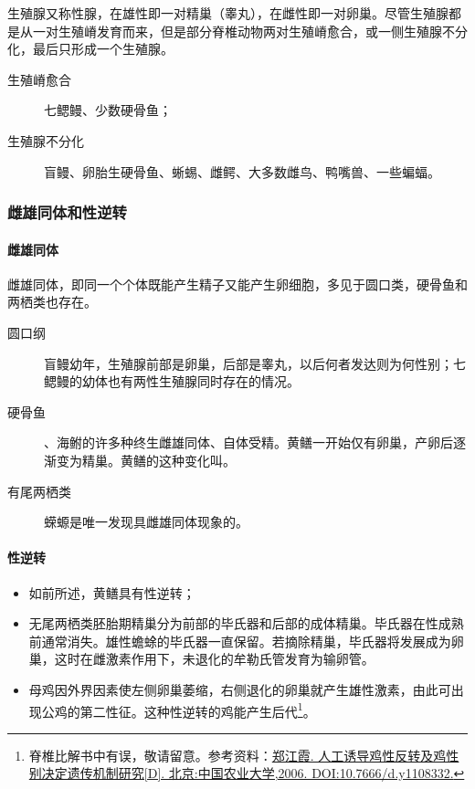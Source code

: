 生殖腺又称性腺，在雄性即一对精巢（睾丸），在雌性即一对卵巢。尽管生殖腺都是从一对生殖嵴发育而来，但是部分脊椎动物两对生殖嵴愈合，或一侧生殖腺不分化，最后只形成一个生殖腺。

\begin{description}
	\item[生殖嵴愈合] 七鳃鳗、少数硬骨鱼；
	\item[生殖腺不分化] 盲鳗、卵胎生硬骨鱼、蜥蜴、雌鳄、大多数雌鸟、鸭嘴兽、一些蝙蝠。
\end{description}

\subsubsection{雌雄同体和性逆转}

\paragraph{雌雄同体}

雌雄同体，即同一个个体既能产生精子又能产生卵细胞，多见于圆口类，硬骨鱼和两栖类也存在。

\begin{description}
	\item[圆口纲] 盲鳗幼年，生殖腺前部是卵巢，后部是睾丸，以后何者发达则为何性别；七鳃鳗的幼体也有两性生殖腺同时存在的情况。
	\item[硬骨鱼] 、海鲋的许多种终生雌雄同体、自体受精。黄鳝一开始仅有卵巢，产卵后逐渐变为精巢。黄鳝的这种变化叫。
	\item[有尾两栖类] 蝾螈是唯一发现具雌雄同体现象的。
\end{description}

\paragraph{性逆转}

\begin{itemize}
	\item 如前所述，黄鳝具有性逆转；
	\item 无尾两栖类胚胎期精巢分为前部的毕氏器和后部的成体精巢。毕氏器在性成熟前通常消失。雄性蟾蜍的毕氏器一直保留。若摘除精巢，毕氏器将发展成为卵巢，这时在雌激素作用下，未退化的牟勒氏管发育为输卵管。
	\item 母鸡因外界因素使左侧卵巢萎缩，右侧退化的卵巢就产生雄性激素，由此可出现公鸡的第二性征。这种性逆转的鸡能产生后代\footnote{脊椎比解书中有误，敬请留意。参考资料：\href{https://d.wanfangdata.com.cn/thesis/Y1108332}{郑江霞. 人工诱导鸡性反转及鸡性别决定遗传机制研究[D]. 北京:中国农业大学,2006. DOI:10.7666/d.y1108332.}}。
\end{itemize}

